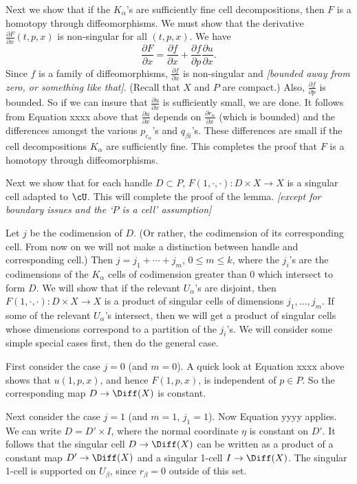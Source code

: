 \documentclass[11pt,leqno]{amsart}
\def\sub{\subset}
\def\pd#1#2{\frac{\partial #1}{\partial #2}}
\def\nn#1{{{\it \small [#1]}}}
\newcommand{\eq}[1]{\begin{displaymath}#1\end{displaymath}}
\begin{document}
Next we show that if the $K_\alpha$'s are sufficiently fine cell decompositions,
then $F$ is a homotopy through diffeomorphisms.
We must show that the derivative $\pd{F}{x}(t, p, x)$ is non-singular for all $(t, p, x)$.
We have
\eq{
    \pd{F}{x} = \pd{f}{x} + \pd{f}{p} \pd{u}{x} .
}
Since $f$ is a family of diffeomorphisms, $\pd{f}{x}$ is non-singular and
\nn{bounded away from zero, or something like that}.
(Recall that $X$ and $P$ are compact.)
Also, $\pd{f}{p}$ is bounded.
So if we can insure that $\pd{u}{x}$ is sufficiently small, we are done.
It follows from Equation xxxx above that $\pd{u}{x}$ depends on $\pd{r_\alpha}{x}$
(which is bounded)
and the differences amongst the various $p_{c_\alpha}$'s and $q_{\beta i}$'s.
These differences are small if the cell decompositions $K_\alpha$ are sufficiently fine.
This completes the proof that $F$ is a homotopy through diffeomorphisms.

\medskip

Next we show that for each handle $D \sub P$, $F(1, \cdot, \cdot) : D\times X \to X$
is a singular cell adapted to $\cU$.
This will complete the proof of the lemma.
\nn{except for boundary issues and the `$P$ is a cell' assumption}

Let $j$ be the codimension of $D$.
(Or rather, the codimension of its corresponding cell.  From now on we will not make a distinction
between handle and corresponding cell.)
Then $j = j_1 + \cdots + j_m$, $0 \le m \le k$,
where the $j_i$'s are the codimensions of the $K_\alpha$
cells of codimension greater than 0 which intersect to form $D$.
We will show that
if the relevant $U_\alpha$'s are disjoint, then
$F(1, \cdot, \cdot) : D\times X \to X$
is a product of singular cells of dimensions $j_1, \ldots, j_m$.
If some of the relevant $U_\alpha$'s intersect, then we will get a product of singular
cells whose dimensions correspond to a partition of the $j_i$'s.
We will consider some simple special cases first, then do the general case.

First consider the case $j=0$ (and $m=0$).
A quick look at Equation xxxx above shows that $u(1, p, x)$, and hence $F(1, p, x)$,
is independent of $p \in P$.
So the corresponding map $D \to \Diff(X)$ is constant.

Next consider the case $j = 1$ (and $m=1$, $j_1=1$).
Now Equation yyyy applies.
We can write $D = D'\times I$, where the normal coordinate $\eta$ is constant on $D'$.
It follows that the singular cell $D \to \Diff(X)$ can be written as a product
of a constant map $D' \to \Diff(X)$ and a singular 1-cell $I \to \Diff(X)$.
The singular 1-cell is supported on $U_\beta$, since $r_\beta = 0$ outside of this set.
\end{document}
